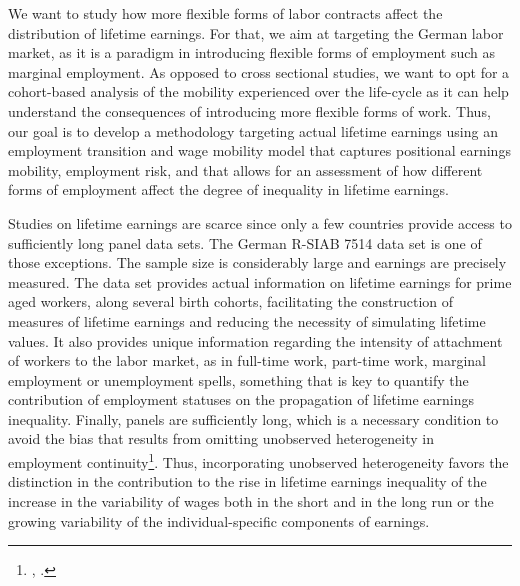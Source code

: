 \documentclass[12pt, a4paper]{article}
\begin{document}


We want to study how more flexible forms of labor contracts affect the distribution of lifetime earnings. For that, we aim at targeting the German labor market, as it is a paradigm in introducing flexible forms of employment such as marginal employment. As opposed to cross sectional studies, we want to opt for a cohort-based analysis of the mobility experienced over the life-cycle as it can help understand the consequences of introducing more flexible forms of work. Thus, our goal is to develop a methodology targeting actual lifetime earnings using an employment transition and wage mobility model that captures positional earnings mobility, employment risk, and that allows for an assessment of how different forms of employment affect the degree of inequality in lifetime earnings.


Studies on lifetime earnings are scarce since only a few countries provide access to sufficiently long panel data sets. The German R-SIAB 7514 data set is one of those exceptions. The sample size is considerably large and earnings are precisely measured. The data set provides actual information on lifetime earnings for prime aged workers, along several birth cohorts, facilitating the construction of measures of lifetime earnings and reducing the necessity of simulating lifetime values. It also provides unique information regarding the intensity of attachment of workers to the labor market, as in full-time work, part-time work, marginal employment or unemployment spells, something that is key to quantify the contribution of employment statuses on the propagation of lifetime earnings inequality. Finally, panels are sufficiently long, which is a necessary condition to avoid the bias that results from omitting unobserved heterogeneity in employment continuity\footnote{\cite{AddiSur08}, \cite{BowRo10}.}. Thus, incorporating unobserved heterogeneity favors the distinction in the contribution to the rise in lifetime earnings inequality of the increase in the variability of wages both in the short and in the long run or the growing variability of the individual-specific components of earnings.
\end{document}
